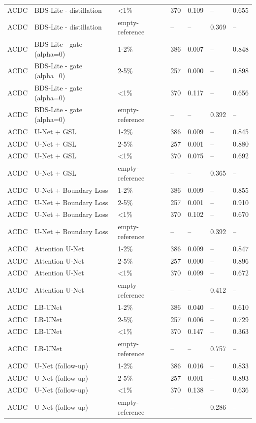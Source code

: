 \begin{longtable}{lllllll}
ACDC & BDS-Lite - distillation & <1\% & 370 & 0.109 & -- & 0.655 \\
ACDC & BDS-Lite - distillation & empty-reference & -- & -- & 0.369 & -- \\
ACDC & BDS-Lite - gate (alpha=0) & 1-2\% & 386 & 0.007 & -- & 0.848 \\
ACDC & BDS-Lite - gate (alpha=0) & 2-5\% & 257 & 0.000 & -- & 0.898 \\
ACDC & BDS-Lite - gate (alpha=0) & <1\% & 370 & 0.117 & -- & 0.656 \\
ACDC & BDS-Lite - gate (alpha=0) & empty-reference & -- & -- & 0.392 & -- \\
ACDC & U-Net + GSL & 1-2\% & 386 & 0.009 & -- & 0.845 \\
ACDC & U-Net + GSL & 2-5\% & 257 & 0.001 & -- & 0.880 \\
ACDC & U-Net + GSL & <1\% & 370 & 0.075 & -- & 0.692 \\
ACDC & U-Net + GSL & empty-reference & -- & -- & 0.365 & -- \\
ACDC & U-Net + Boundary Loss & 1-2\% & 386 & 0.009 & -- & 0.855 \\
ACDC & U-Net + Boundary Loss & 2-5\% & 257 & 0.001 & -- & 0.910 \\
ACDC & U-Net + Boundary Loss & <1\% & 370 & 0.102 & -- & 0.670 \\
ACDC & U-Net + Boundary Loss & empty-reference & -- & -- & 0.392 & -- \\
ACDC & Attention U-Net & 1-2\% & 386 & 0.009 & -- & 0.847 \\
ACDC & Attention U-Net & 2-5\% & 257 & 0.000 & -- & 0.896 \\
ACDC & Attention U-Net & <1\% & 370 & 0.099 & -- & 0.672 \\
ACDC & Attention U-Net & empty-reference & -- & -- & 0.412 & -- \\
ACDC & LB-UNet & 1-2\% & 386 & 0.040 & -- & 0.610 \\
ACDC & LB-UNet & 2-5\% & 257 & 0.006 & -- & 0.729 \\
ACDC & LB-UNet & <1\% & 370 & 0.147 & -- & 0.363 \\
ACDC & LB-UNet & empty-reference & -- & -- & 0.757 & -- \\
ACDC & U-Net (follow-up) & 1-2\% & 386 & 0.016 & -- & 0.833 \\
ACDC & U-Net (follow-up) & 2-5\% & 257 & 0.001 & -- & 0.893 \\
ACDC & U-Net (follow-up) & <1\% & 370 & 0.138 & -- & 0.636 \\
ACDC & U-Net (follow-up) & empty-reference & -- & -- & 0.286 & -- \\

\end{longtable}
